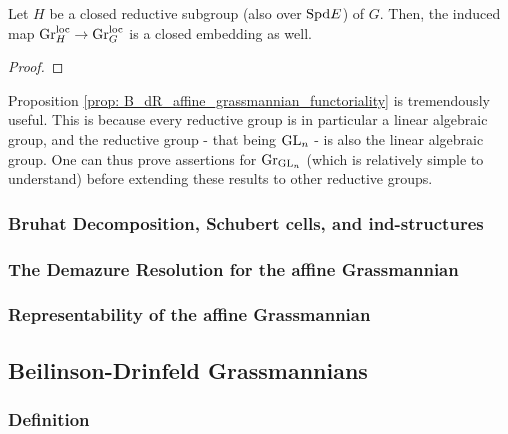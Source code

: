                 \begin{proposition} \label{prop: B_dR_affine_grassmannian_functoriality}
                    Let $H$ be a closed reductive subgroup (also over $\mathrm{Spd} E$) of $G$. Then, the induced map $\mathrm{Gr}_H^{\mathrm{loc}} \to \mathrm{Gr}_G^{\mathrm{loc}}$ is a closed embedding as well.
                \end{proposition}
                    \begin{proof}
                        
                    \end{proof}
                \begin{remark}
                    Proposition \ref{prop: B_dR_affine_grassmannian_functoriality} is tremendously useful. This is because every reductive group is in particular a linear algebraic group, and the  reductive group - that being $\operatorname{GL}_n$ - is also the  linear algebraic group. One can thus prove assertions for $\mathrm{Gr}_{\operatorname{GL}_n}$ (which is relatively simple to understand) before extending these results to other reductive groups.  
                \end{remark}
                    
            \subsubsection{Bruhat Decomposition, Schubert cells, and ind-structures}
            
            \subsubsection{The Demazure Resolution for the affine Grassmannian}
            
            \subsubsection{Representability of the affine Grassmannian}
            
        \subsection{Beilinson-Drinfeld Grassmannians}
            \subsubsection{Definition}
            
